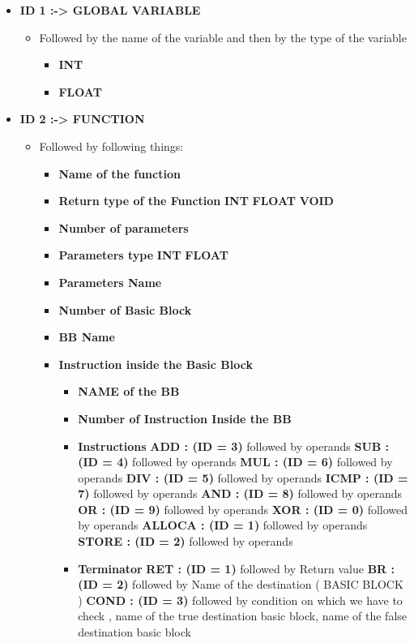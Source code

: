 \documentclass[openany]{book}
\begin{document}
\begin{itemize}
	\item \textbf{ID 1 :->  GLOBAL VARIABLE }
	\begin{itemize}
		\item 	Followed by the name of the variable and then by the type of the variable\newline
		\begin{itemize}
			\item  \textbf{INT} 
			\item  \textbf{FLOAT} \newline
		\end{itemize}
	\end{itemize}

	\item  \textbf{ID 2 :-> FUNCTION}
	\begin{itemize}
		\item Followed by following things:\newline
		\begin{itemize}
			\item \textbf{Name of the function}
			\item \textbf{Return type of the Function}
			\subitem \textbf{INT}  
			\subitem \textbf{FLOAT} 
			\subitem \textbf{VOID}
			\item \textbf{Number of parameters}
			\item \textbf{Parameters type}
			\subitem \textbf{INT}
			\subitem \textbf{FLOAT}
			\item \textbf{Parameters Name}
			\item \textbf{Number of Basic Block}
			\item \textbf{BB Name}
			\item \textbf{Instruction inside the Basic Block}
			\begin{itemize}
				\item \textbf{NAME of the BB}
				\item \textbf{Number of Instruction Inside the BB}
				\item \textbf{Instructions}		
				\subitem \textbf{ADD : (ID = 3)} followed by operands
				\subitem \textbf{SUB : (ID = 4)} followed by operands
				\subitem \textbf{MUL : (ID = 6)} followed by operands
				\subitem \textbf{DIV : (ID = 5)} followed by operands
				\subitem \textbf{ICMP : (ID = 7)} followed by operands
				\subitem \textbf{AND : (ID = 8)} followed by operands
				\subitem \textbf{OR : (ID = 9)} followed by operands
				\subitem \textbf{XOR : (ID = 0)} followed by operands
				\subitem \textbf{ALLOCA : (ID = 1)} followed by operands
				\subitem \textbf{STORE : (ID = 2)} followed by operands
				\item  \textbf{Terminator}
				\subitem \textbf{RET : (ID = 1)} followed by Return value
				\subitem \textbf{BR : (ID = 2)} followed by Name of the destination ( BASIC BLOCK )
				\subitem \textbf{COND : (ID = 3)} followed by condition on which we have to check , name of the true destination basic block, name of the false destination basic block
			\end{itemize}
		\end{itemize}
	\end{itemize} 
\end{itemize}
\end{document}
